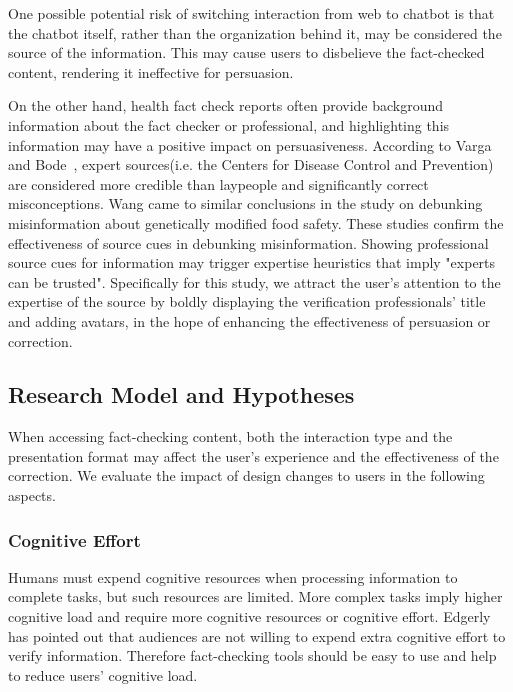 One possible potential risk of switching interaction from web to chatbot is that the chatbot itself, rather than the organization behind it, may be considered the source of the information\cite[]{ischen2020here}.
This may cause users to disbelieve the fact-checked content, rendering it ineffective for persuasion\cite[]{shin2022people}.

On the other hand, health fact check reports often provide background information about the fact checker or professional, and highlighting this information may have a positive impact on persuasiveness.
According to Varga and Bode~\cite[]{vraga2017using}, expert sources(i.e. the Centers for Disease Control and Prevention) are considered more credible than laypeople and significantly correct misconceptions.
Wang\cite[]{wang2021debunking} came to similar conclusions in the study on debunking misinformation about genetically modified food safety. These studies confirm the effectiveness of source cues in debunking misinformation.
Showing professional source cues for information may trigger expertise heuristics that imply "experts can be trusted"\cite[]{sundar2008main}.
Specifically for this study, we attract the user's attention to the expertise of the source by boldly displaying the verification professionals' title and adding avatars, in the hope of enhancing the effectiveness of persuasion or correction.

\subsection{Research Model and Hypotheses}
When accessing fact-checking content, both the interaction type and the presentation format may affect the user's experience and the effectiveness of the correction. 
We evaluate the impact of design changes to users in the following aspects.

\subsubsection*{Cognitive Effort}
Humans must expend cognitive resources when processing information to complete tasks, but such resources are limited. 
More complex tasks imply higher cognitive load and require more cognitive resources or cognitive effort. 
Edgerly\cite[]{edgerly2017seeking} has pointed out that audiences are not willing to expend extra cognitive effort to verify information. 
Therefore fact-checking tools should be easy to use and help to reduce users' cognitive load.

